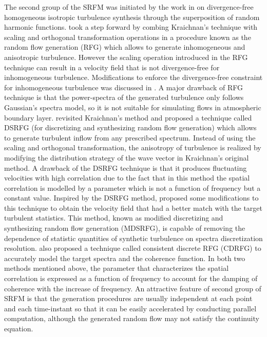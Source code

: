 The second group of the SRFM was initiated by the work in \cite{kraichnan1970} on divergence-free homogeneous isotropic turbulence synthesis through the superposition of random harmonic functions. \cite{smirnov2001} took a step forward by combing Kraichnan's technique with scaling and orthogonal transformation operations in a procedure known as the random flow generation (RFG) which allows to generate inhomogeneous and anisotropic turbulence. However the scaling operation introduced in the RFG technique can result in a velocity field that is not divergence-free for inhomogeneous turbulence. Modifications to enforce the divergence-free constraint for inhomogeneous turbulence was discussed in \cite{yu2014}. A major drawback of RFG technique is that the power-spectra of the generated turbulence only follows Gaussian's spectra model, so it is not suitable for simulating flows in atmospheric boundary layer. \cite{huang2010} revisited Kraichnan's method and proposed a technique called DSRFG (for discretizing and synthesizing random flow generation) which allows to generate turbulent inflow from any prescribed spectrum. Instead of using the scaling and orthogonal transformation, the anisotropy of turbulence is realized by modifying the distribution strategy of the wave vector in Kraichnan's original method. A drawback of the DSRFG technique is that it produces fluctuating velocities with high correlation due to the fact that in this method the spatial correlation is modelled by a parameter which is not a function of frequency but a constant value. Inspired by the DSRFG method, \cite{castro2017} proposed some modifications to this technique to obtain the velocity field that had a better match with the target turbulent statistics. This method, known as modified discretizing and synthesizing random flow generation (MDSRFG), is capable of removing the dependence of statistic quantities of synthetic turbulence on spectra discretization resolution. \cite{aboshosha2015} also proposed a technique called consistent discrete RFG (CDRFG) to accurately model the target spectra and the coherence function. In both two methods mentioned above, the parameter that characterizes the spatial correlation is expressed as a function of frequency to account for the damping of coherence with the increase of frequency. An attractive feature of second group of SRFM is that the generation procedures are usually independent at each point and each time-instant so that it can be easily accelerated by conducting parallel computation, although the generated random flow may not satisfy the continuity equation. 

